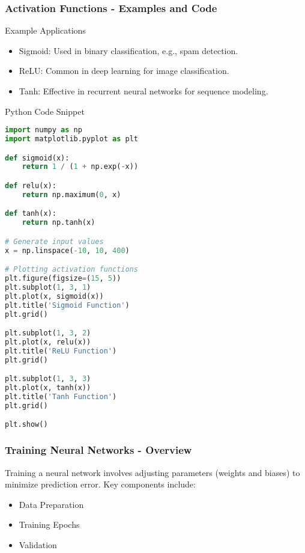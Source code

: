 \documentclass[aspectratio=169]{beamer}
\begin{document}
\begin{frame}[fragile]
    \frametitle{Activation Functions - Examples and Code}
    \begin{block}{Example Applications}
        \begin{itemize}
            \item Sigmoid: Used in binary classification, e.g., spam detection.
            \item ReLU: Common in deep learning for image classification.
            \item Tanh: Effective in recurrent neural networks for sequence modeling.
        \end{itemize}
    \end{block}

    \begin{block}{Python Code Snippet}
    \begin{lstlisting}[language=Python]
import numpy as np
import matplotlib.pyplot as plt

def sigmoid(x):
    return 1 / (1 + np.exp(-x))

def relu(x):
    return np.maximum(0, x)

def tanh(x):
    return np.tanh(x)

# Generate input values
x = np.linspace(-10, 10, 400)

# Plotting activation functions
plt.figure(figsize=(15, 5))
plt.subplot(1, 3, 1)
plt.plot(x, sigmoid(x))
plt.title('Sigmoid Function')
plt.grid()

plt.subplot(1, 3, 2)
plt.plot(x, relu(x))
plt.title('ReLU Function')
plt.grid()

plt.subplot(1, 3, 3)
plt.plot(x, tanh(x))
plt.title('Tanh Function')
plt.grid()

plt.show()
    \end{lstlisting}
    \end{block}
\end{frame}

\begin{frame}
    \frametitle{Training Neural Networks - Overview}
    Training a neural network involves adjusting parameters (weights and biases) to minimize prediction error. Key components include:
    \begin{itemize}
        \item Data Preparation
        \item Training Epochs
        \item Validation
    \end{itemize}
\end{frame}
\end{document}
